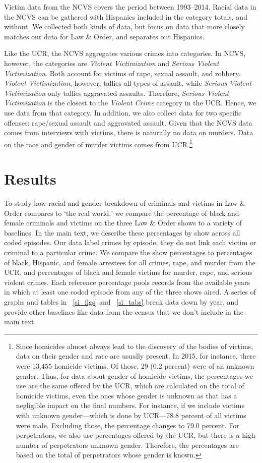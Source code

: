 \documentclass[11pt, letterpaper]{article}
\begin{document}
Victim data from the NCVS covers the period between 1993--2014. Racial data in the NCVS can be gathered with Hispanics included in the category totals, and without. We collected both kinds of data, but focus on data that more closely matches our data for Law \& Order, and separates out Hispanics.

Like the UCR, the NCVS aggregates various crimes into categories. In NCVS, however, the categories are \textit{Violent Victimization} and \textit{Serious Violent Victimization}. Both account for victims of rape, sexual assault, and robbery. \textit{Violent Victimization}, however, tallies all types of assault, while \textit{Serious Violent Victimization} only tallies aggravated assaults. Therefore, \textit{Serious Violent Victimization} is the closest to the \textit{Violent Crime} category in the UCR. Hence, we use data from that category. In addition, we also collect data for two specific offenses: rape/sexual assault and aggravated assault. Given that the NCVS data comes from interviews with victims, there is naturally no data on murders. Data on the race and gender of murder victims comes from UCR.\footnote{Since homicides almost always lead to the discovery of the bodies of victims, data on their gender and race are usually present. In 2015, for instance, there were 13,455 homicide victims. Of those, 29 (0.2 percent) were of an unknown gender. Thus, for data about gender of homicide victims, the percentages we use are the same offered by the UCR, which are calculated on the total of homicide victims, even the ones whose gender is unknown as that has a negligible impact on the final numbers. For instance, if we include victims with unknown gender---which is done by UCR---78.8 percent of all victims were male. Excluding those, the percentage changes to 79.0 percent. For perpetrators, we also use percentages offered by the UCR, but there is a high number of perpetrators unknown gender. Therefore, the percentages are based on the total of perpetrators whose gender is known.}

\section*{Results}
To study how racial and gender breakdown of criminals and victims in Law \& Order compares to `the real world,' we compare the percentage of black and female criminals and victims on the three Law \& Order shows to a variety of baselines. In the main text, we describe these percentages by show across all coded episodes. Our data label crimes by episode; they do not link each victim or criminal to a particular crime. We compare the show percentages to percentages of black, Hispanic, and female arrestees for all crimes, rape, and murder from the UCR, and percentages of black and female victims for murder, rape, and serious violent crimes. Each reference percentage pools records from the available years in which at least one coded episode from any of the three shows aired. A series of graphs and tables in ~\ref{si_figs} and ~\ref{si_tabs} break data down by year, and provide other baselines like data from the census that we don't include in the main text.
\end{document}
